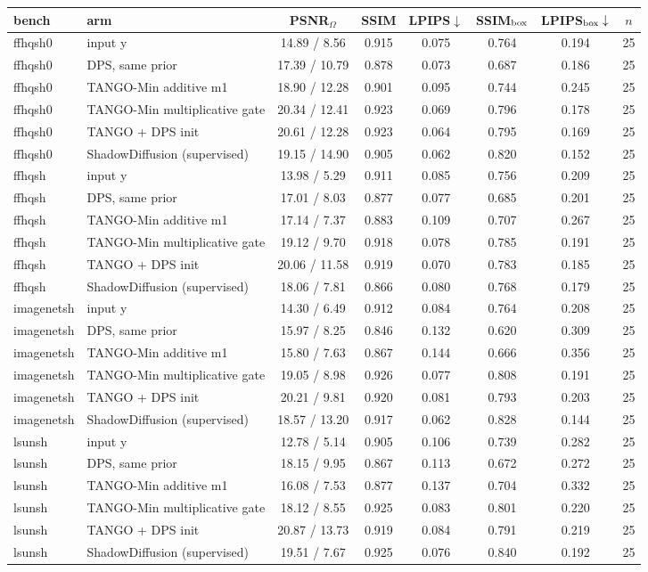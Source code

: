 \begin{tabular}{llcccccc}
\toprule
bench & arm & PSNR$_\Omega$ & SSIM & LPIPS$\downarrow$ & SSIM$_{\rm box}$ & LPIPS$_{\rm box}\downarrow$ & $n$\\
\midrule
ffhqsh0 & input y & 14.89 / 8.56 & 0.915 & 0.075 & 0.764 & 0.194 & 25\\
ffhqsh0 & DPS, same prior & 17.39 / 10.79 & 0.878 & 0.073 & 0.687 & 0.186 & 25\\
ffhqsh0 & TANGO-Min additive m1 & 18.90 / 12.28 & 0.901 & 0.095 & 0.744 & 0.245 & 25\\
ffhqsh0 & TANGO-Min multiplicative gate & 20.34 / 12.41 & 0.923 & 0.069 & 0.796 & 0.178 & 25\\
ffhqsh0 & TANGO + DPS init & 20.61 / 12.28 & 0.923 & 0.064 & 0.795 & 0.169 & 25\\
ffhqsh0 & ShadowDiffusion (supervised) & 19.15 / 14.90 & 0.905 & 0.062 & 0.820 & 0.152 & 25\\
\midrule
ffhqsh & input y & 13.98 / 5.29 & 0.911 & 0.085 & 0.756 & 0.209 & 25\\
ffhqsh & DPS, same prior & 17.01 / 8.03 & 0.877 & 0.077 & 0.685 & 0.201 & 25\\
ffhqsh & TANGO-Min additive m1 & 17.14 / 7.37 & 0.883 & 0.109 & 0.707 & 0.267 & 25\\
ffhqsh & TANGO-Min multiplicative gate & 19.12 / 9.70 & 0.918 & 0.078 & 0.785 & 0.191 & 25\\
ffhqsh & TANGO + DPS init & 20.06 / 11.58 & 0.919 & 0.070 & 0.783 & 0.185 & 25\\
ffhqsh & ShadowDiffusion (supervised) & 18.06 / 7.81 & 0.866 & 0.080 & 0.768 & 0.179 & 25\\
\midrule
imagenetsh & input y & 14.30 / 6.49 & 0.912 & 0.084 & 0.764 & 0.208 & 25\\
imagenetsh & DPS, same prior & 15.97 / 8.25 & 0.846 & 0.132 & 0.620 & 0.309 & 25\\
imagenetsh & TANGO-Min additive m1 & 15.80 / 7.63 & 0.867 & 0.144 & 0.666 & 0.356 & 25\\
imagenetsh & TANGO-Min multiplicative gate & 19.05 / 8.98 & 0.926 & 0.077 & 0.808 & 0.191 & 25\\
imagenetsh & TANGO + DPS init & 20.21 / 9.81 & 0.920 & 0.081 & 0.793 & 0.203 & 25\\
imagenetsh & ShadowDiffusion (supervised) & 18.57 / 13.20 & 0.917 & 0.062 & 0.828 & 0.144 & 25\\
\midrule
lsunsh & input y & 12.78 / 5.14 & 0.905 & 0.106 & 0.739 & 0.282 & 25\\
lsunsh & DPS, same prior & 18.15 / 9.95 & 0.867 & 0.113 & 0.672 & 0.272 & 25\\
lsunsh & TANGO-Min additive m1 & 16.08 / 7.53 & 0.877 & 0.137 & 0.704 & 0.332 & 25\\
lsunsh & TANGO-Min multiplicative gate & 18.12 / 8.55 & 0.925 & 0.083 & 0.801 & 0.220 & 25\\
lsunsh & TANGO + DPS init & 20.87 / 13.73 & 0.919 & 0.084 & 0.791 & 0.219 & 25\\
lsunsh & ShadowDiffusion (supervised) & 19.51 / 7.67 & 0.925 & 0.076 & 0.840 & 0.192 & 25\\
\bottomrule
\end{tabular}
